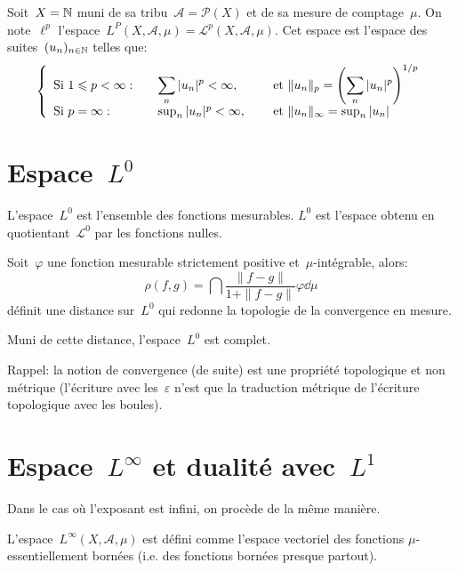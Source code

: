 \begin{definition}
Soit~$X=\mathbb N$ muni de sa tribu~$\mathcal{A}=\mathcal{P}(X)$ et de sa mesure de comptage~$\mu$.
On note~$\ell^p$ l'espace~$L^P(X,\mathcal{A},\mu)=\mathcal{L}^p(X,\mathcal{A},\mu)$.
Cet espace est l'espace des suites~$(u_n)_{n\in\mathbb N}$ telles que:
\begin{equation}
\left\{
\begin{array}{lll}
\text{Si } 1\leqslant p<\infty: &\quad \displaystyle\sum_n |u_n|^p<\infty, &\quad \text{ et } \|u_n\|_p=\left(\displaystyle\sum_n|u_n|^p\right)^{1/p}\\
\text{Si } p=\infty: &\quad \sup_n |u_n|^p<\infty, &\quad \text{ et } \|u_n\|_\infty=\sup_n|u_n|
\end{array}
\right.
\end{equation}
\end{definition}

\medskip
\section{Espace~$L^0$}
L'espace~$L^0$ est l'ensemble des fonctions mesurables.
$L^0$ est l'espace obtenu en quotientant~$\mathcal{L^0}$ par les fonctions nulles.

\medskip
Soit~$\varphi$ une fonction mesurable strictement positive et~$\mu$-intégrable, alors:
\begin{equation}
\rho(f,g)=\dint \frac{\|f-g\|}{1+\|f-g\|} \varphi \dd\mu
\end{equation}
définit une distance sur~$L^0$ qui redonne la topologie de la convergence en mesure.

\begin{theoreme}
Muni de cette distance, l'espace~$L^0$ est complet.
\end{theoreme}

\medskip
Rappel: la notion de convergence (de suite) est une propriété topologique et non métrique (l'écriture avec les~$\varepsilon$ n'est que la traduction métrique de l'écriture topologique avec les boules).

\medskip
\section{Espace~$L^\infty$ et dualité avec~$L^1$}
Dans le cas où l'exposant est infini, on procède de la même manière.

\medskip
L'espace~$L^\infty(X, \mathcal{A}, \mu)$ est défini comme l'espace vectoriel des fonctions $\mu$-essentiellement bornées (i.e. des fonctions bornées presque partout).


